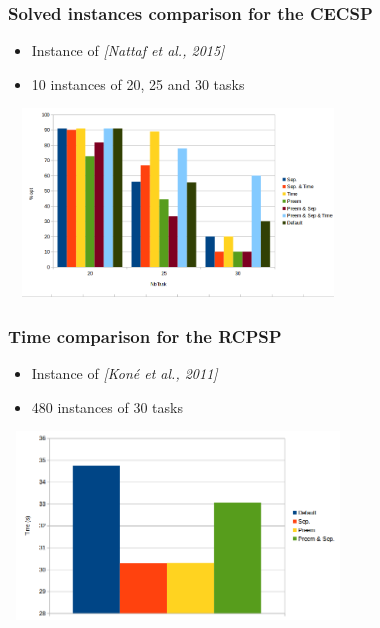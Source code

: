 \begin{frame}
\frametitle{Solved instances comparison for the CECSP}
\begin{itemize}
\item Instance of {\color{gray!50!black!70}\it [Nattaf et al., 2015]}
\item 10 instances of 20, 25 and 30 tasks
\end{itemize}
\vfill
\begin{center}
\includegraphics[height=5cm, width=9cm]{opt_CECSP.png}
\end{center}
\end{frame}

\begin{frame}
\frametitle{Time comparison for the RCPSP}
\begin{itemize}
\item Instance of {\color{gray!50!black!70} \it [Koné et al., 2011]}
\item 480 instances of 30 tasks
\end{itemize}
\vfill
\begin{center}
\includegraphics[height=5cm, width=9cm]{timeRCPSP.png}
\end{center}
\end{frame}
